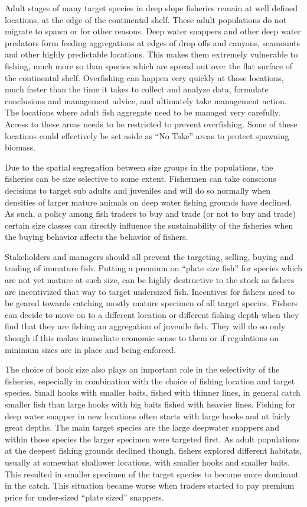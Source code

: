 Adult stages of many target species in deep slope fisheries remain at well defined locations, at the edge of the continental shelf. These adult populations do not migrate to spawn or for other reasons. Deep water snappers and other deep water predators form feeding aggregations at edges of drop offs and canyons, seamounts and other highly predictable locations. This makes them extremely vulnerable to fishing, much more so than species which are spread out over the flat surface of the continental shelf. Overfishing can happen very quickly at those locations, much faster than the time it takes to collect and analyze data, formulate conclusions and management advice, and ultimately take management action. The locations where adult fish aggregate need to be managed very carefully. Access to these areas needs to be restricted to prevent overfishing. Some of these locations could effectively be set aside as ``No Take'' areas to protect spawning biomass.

Due to the spatial segregation between size groups in the populations, the fisheries can be size selective to some extent. Fishermen can take conscious decisions to target sub adults and juveniles and will do so normally when densities of larger mature animals on deep water fishing grounds have declined. As such, a policy among fish traders to buy and trade (or not to buy and trade) certain size classes can directly influence the sustainability of the fisheries when the buying behavior affects the behavior of fishers.

Stakeholders and managers should all prevent the targeting, selling, buying and trading of immature fish. Putting a premium on ``plate size fish'' for species which are not yet mature at such size, can be highly destructive to the stock as fishers are incentivized that way to target undersized fish. Incentives for fishers need to be geared towards catching mostly mature specimen of all target species. Fishers can decide to move on to a different location or different fishing depth when they find that they are fishing an aggregation of juvenile fish. They will do so only though if this makes immediate economic sense to them or if regulations on minimum sizes are in place and being enforced.

The choice of hook size also plays an important role in the selectivity of the fisheries, especially in combination with the choice of fishing location and target species. Small hooks with smaller baits, fished with thinner lines, in general catch smaller fish than large hooks with big baits fished with heavier lines. Fishing for deep water snapper in new locations often starts with large hooks and at fairly great depths. The main target species are the large deepwater snappers and within those species the larger specimen were targeted first. As adult populations at the deepest fishing grounds declined though, fishers explored different habitats, usually at somewhat shallower locations, with smaller hooks and smaller baits. This resulted in smaller specimen of the target species to become more dominant in the catch. This situation became worse when traders started to pay premium price for under-sized ``plate sized'' snappers.

